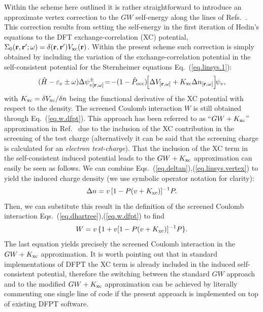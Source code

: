 \documentclass[twocolumn,prb,showpacs,superscriptaddress]{revtex4}
\def\w{\omega}
\def\H{\hat{H}}
\def\P{\hat{P}_{\rm occ}}
\def\E{\varepsilon}
\def\r{{\bf r}}
\def\rp{{\bf r^\prime}}
\begin{document}
Within the scheme here outlined it is rather straightforward to introduce
an approximate vertex correction to the $GW$ self-energy along the lines 
of Refs.\ . This correction results from setting
the self-energy in the first iteration of Hedin's equations to the DFT
exchange-correlation (XC) potential, $\Sigma_0(\r,\rp;\w) = \delta(\r,\rp) V_{\rm xc}(\r)$.
Within the present scheme such correction is simply obtained by including
the variation of the exchange-correlation
potential in the self-consistent potential for the Sternheimer equations Eq.\ (\ref{eq.linsys.1}):
  \begin{equation}\label{eq.linsys.vertex}
  (\H-\E_v\pm\w) \Delta \psi^\pm_{v[\r,\w]}\!  = \!-(1-\P)\!  \Big[\Delta V_{[\r,\w]} + K_{\rm xc}\Delta n_{[\r,\w]}\Big] \! \psi_v,
  \end{equation}
with $K_{\rm xc}=\delta V_{\rm xc}/\delta n$ being the functional derivative of the XC
potential with respect to the density. The screened Coulomb interaction $W$ is still
obtained through Eq.\ (\ref{eq.w.dfpt}). This approach has been referred to as
``$GW+K_{\rm xc}$'' approximation in Ref.\  due to the inclusion of the XC contribution
in the screening of the test charge (alternatively it can be said that the screening
charge is calculated for an {\it electron test-charge}).
That the inclusion of the XC term in the self-consistent
induced potential leads to the $GW+K_{\rm xc}$ approximation can easily be seen as follows.
We can combine Eqs.\ (\ref{eq.deltan}),(\ref{eq.linsys.vertex}) to yield
the induced charge density (we use symbolic operator notation for clarity):
 \begin{equation}
 \Delta n = v\,[1- P (v+K_{\rm xc})]^{-1}P .
 \end{equation}
Then, we can substitute this result in the definition of the screened Coulomb interaction
Eqs.\ (\ref{eq.dhartree}),(\ref{eq.w.dfpt}) to find
 \begin{equation}
 W = v \,\{ 1 + v [1-P(v+K_{\rm xc})]^{-1}P \}.
 \end{equation}
The last equation yields precisely the screened Coulomb interaction in the $GW+K_{\rm xc}$ approximation.\cite{hl86,reining94}
It is worth pointing out that in standard implementations of DFPT the
XC term is already included in the induced self-consistent potential,\cite{baroni.rmp}
therefore the switching between the standard $GW$ approach and to the modified $GW+K_{\rm xc}$
approximation can be achieved by literally commenting one single line of code
if the present approach is implemented on top of existing DFPT software.\cite{espresso}
\end{document}
